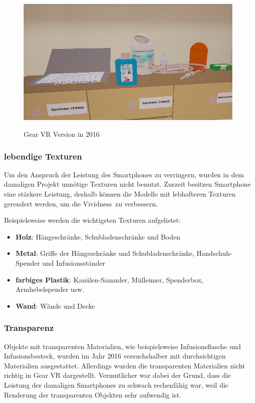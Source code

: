 \begin{figure}[ht]
\vspace*{1em}
\centering
\caption{Gear VR Version in 2016}
\includegraphics[width=\textwidth]{images/WithoutGlass.png}
\label{fig:WithoutGlass} 
\end{figure}
  
   \subsubsection{lebendige Texturen}
   
   Um den Anspruch der Leistung des Smartphones zu verringern, wurden in dem damaligen Projekt unnötige Texturen nicht benutzt. Zurzeit besitzen Smartphone eine stärkere Leistung, deshalb können die Modelle mit lebhafteren Texturen gerendert werden, um die \glqq Vividness\grqq\ zu verbessern.
   
   Beispielsweise werden die wichtigsten Texturen aufgelistet:
   \begin{itemize}
       \item \textbf{Holz}: Hängeschränke, Schubladenschränke und Boden
       \item \textbf{Metal}: Griffe der Hängeschränke und Schubladenschränke, Handschuh-Spender und Infusionsständer
       \item \textbf{farbiges Plastik}: Kanülen-Sammler, Mülleimer, Spenderbox, Armhebelspender usw.
       \item \textbf{Wand}: Wände und Decke
   \end{itemize}
   
   \subsubsection{Transparenz}
   Objekte mit transparenten Materialien, wie beispielsweise Infusionsflasche und Infusionsbesteck, wurden im Jahr 2016 versuchshalber mit durchsichtigen Materialien ausgestattet. Allerdings wurden die transparenten Materialien nicht richtig in Gear VR dargestellt. Vermutlicher war dabei der Grund, dass die Leistung der damaligen Smartphones zu schwach rechenfähig war, weil die Renderung der transparenten Objekten sehr aufwendig ist.
   
